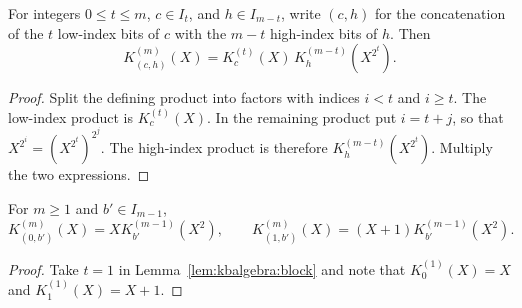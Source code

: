 \begin{lemma}\label{lem:kbalgebra:block}
For integers $0\leq t\leq m$, $c\in I_t$, and $h\in I_{m-t}$, write $(c,h)$ for the concatenation of the $t$ low-index bits of $c$ with the $m-t$ high-index bits of $h$. Then
\begin{equation}\label{eq:kbalgebra:block}
 K_{(c,h)}^{(m)}(X)=K_c^{(t)}(X)\,K_h^{(m-t)}(X^{2^t}).
\end{equation}
\end{lemma}
\begin{proof}
Split the defining product into factors with indices $i<t$ and $i\geq t$. The low-index product is $K_c^{(t)}(X)$. In the remaining product put $i=t+j$, so that $X^{2^i}=(X^{2^t})^{2^j}$. The high-index product is therefore $K_h^{(m-t)}(X^{2^t})$. Multiply the two expressions.
\end{proof}

\begin{corollary}\label{cor:kbalgebra:recursion}
For $m\geq1$ and $b'\in I_{m-1}$,
\[
 K_{(0,b')}^{(m)}(X)=XK_{b'}^{(m-1)}(X^2),\qquad
 K_{(1,b')}^{(m)}(X)=(X+1)K_{b'}^{(m-1)}(X^2).
\]
\end{corollary}
\begin{proof}
Take $t=1$ in Lemma~\ref{lem:kbalgebra:block} and note that $K_0^{(1)}(X)=X$ and $K_1^{(1)}(X)=X+1$.
\end{proof}

